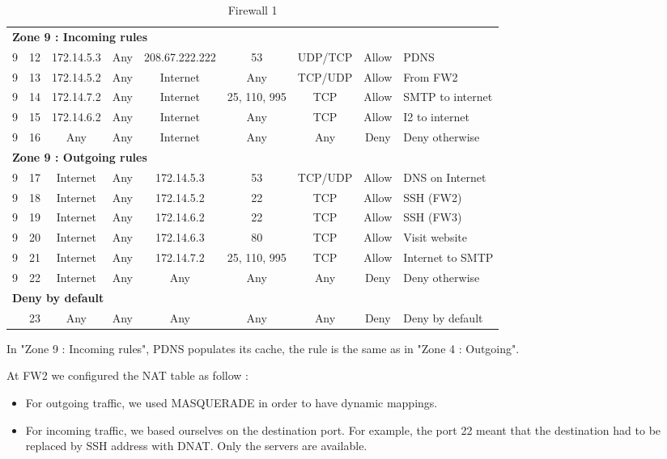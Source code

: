 \documentclass[a4paper,titlepage]{article}
\begin{document}
\begin{table}[h]
\begin{tabular}{c|c|cc|cc|ccl}
		\hline
		\multicolumn{9}{l}{\textbf{Zone 9 : Incoming rules}}\\
		9 & 12 & 172.14.5.3 & Any & 208.67.222.222 & 53 & UDP/TCP & Allow & PDNS\\
		9 & 13 & 172.14.5.2 & Any & Internet & Any & TCP/UDP & Allow & From FW2\\
		9 & 14 & 172.14.7.2 & Any & Internet & 25, 110, 995 & TCP & Allow & SMTP to internet\\
		9 & 15 & 172.14.6.2 & Any & Internet & Any & TCP & Allow & I2 to internet\\
		9 & 16 & Any & Any & Internet & Any & Any & Deny & Deny otherwise\\

		\hline
		\multicolumn{9}{l}{\textbf{Zone 9 : Outgoing rules}}\\
		9 & 17 & Internet & Any & 172.14.5.3 & 53 & TCP/UDP & Allow & DNS on Internet\\
		9 & 18 & Internet & Any & 172.14.5.2 & 22 & TCP & Allow & SSH (FW2)\\
		9 & 19 & Internet & Any & 172.14.6.2 & 22 & TCP & Allow & SSH (FW3)\\
		9 & 20 & Internet & Any & 172.14.6.3 & 80 & TCP & Allow & Visit website\\
		9 & 21 & Internet & Any & 172.14.7.2 & 25, 110, 995 & TCP & Allow & Internet to SMTP\\
		9 & 22 & Internet & Any & Any & Any & Any & Deny & Deny otherwise\\

		\multicolumn{9}{l}{\textbf{Deny by default}}\\
		  & 23 & Any & Any & Any & Any & Any & Deny & Deny by default\\
		\hline
	\end{tabular}
	\caption{Firewall 1}
\end{table}

In "Zone 9 : Incoming rules", PDNS populates its cache, the rule is the same as in "Zone 4 : Outgoing".


At FW2 we configured the NAT table as follow :
\begin{itemize}
\item For outgoing traffic, we used MASQUERADE in order to have dynamic mappings.
\item For incoming traffic, we based ourselves on the destination port. For example, the port 22 meant that the destination had to be replaced by SSH address with DNAT. Only the servers are available.
\end{itemize}
\end{document}
